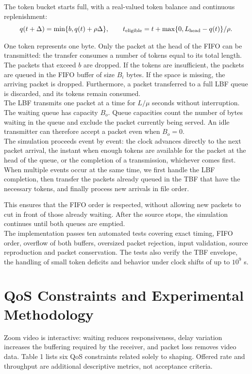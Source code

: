 \documentclass[10pt,a4paper]{article}
\begin{document}
The token bucket starts full, with a real-valued token balance and continuous replenishment:
\begin{equation}
    q(t+\Delta)=\min\{b,q(t)+\rho\Delta\},\qquad
t_{\rm eligible}=t+\max\{0,L_{\rm head}-q(t)\}/\rho.
\end{equation}

One token represents one byte. Only the packet at the head of the FIFO can be transmitted: the transfer consumes a number of tokens equal to its total length. The packets that exceed $b$ are dropped. If the tokens are insufficient, the packets are queued in the FIFO buffer of size $B_i$ bytes. If the space is missing, the arriving packet is dropped. Furthermore, a packet transferred to a full LBF queue is discarded, and its tokens remain consumed. \\

The LBF transmits one packet at a time for $L/\mu$ seconds without interruption. The waiting queue has capacity $B_o$. Queue capacities count the number of bytes waiting in the queue and exclude the packet currently being served. An idle transmitter can therefore accept a packet even when $B_o = 0$. \\

The simulation proceeds event by event: the clock advances directly to the next
packet arrival, the instant when enough tokens are available for the packet at
the head of the queue, or the completion of a transmission, whichever comes first.
When multiple events occur at the same time, we first handle the LBF completion,
then transfer the packets already queued in the TBF that have the necessary tokens,
and finally process new arrivals in file order.

This ensures that the FIFO order is respected, without allowing new packets to cut in front of those already waiting. After the source stops, the simulation continues until both queues are emptied. \\

The implementation passes ten automated tests covering exact timing, FIFO order,
overflow of both buffers, oversized packet rejection, input validation, source
reproduction and packet conservation. The tests also verify the TBF envelope,
the handling of small token deficits and behavior under clock shifts of up to $10^9$ s.

\clearpage

\section{QoS Constraints and Experimental Methodology}
Zoom video is interactive: waiting reduces responsiveness, delay variation increases
the buffering required by the receiver, and packet loss removes video data.
Table 1 lists six QoS constraints related solely to shaping. Offered rate and
throughput are additional descriptive metrics, not acceptance criteria.
\end{document}
